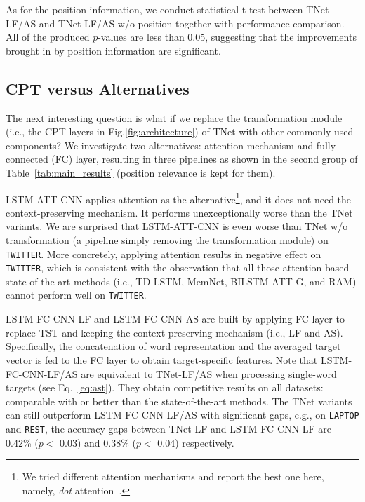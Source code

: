 \documentclass[11pt,a4paper]{article}
\begin{document}
As for the position information, we conduct statistical t-test between TNet-LF/AS and TNet-LF/AS w/o position together with performance comparison. All of the produced $p$-values are less than 0.05, suggesting that the improvements brought in by position information are significant. 






\subsection{CPT versus Alternatives}
The next interesting question is what if we replace the transformation module (i.e., the CPT layers in Fig.\ref{fig:architecture}) of TNet with other commonly-used components? We investigate two alternatives: attention mechanism and fully-connected (FC) layer, resulting in three pipelines as shown in the second group of Table~\ref{tab:main_results} (position relevance is kept for them).

LSTM-ATT-CNN applies attention as the alternative\footnote{We tried different attention mechanisms and report the best one here, namely, \textit{dot} attention~\cite{luong-pham-manning:2015:EMNLP}.}, and it does not need the context-preserving mechanism. It performs unexceptionally worse than the TNet variants. We are surprised that LSTM-ATT-CNN is even worse than TNet w/o transformation (a pipeline simply removing the transformation module) on \texttt{TWITTER}. More concretely, applying attention results in negative effect on \texttt{TWITTER}, which is consistent with the observation that all those attention-based state-of-the-art methods (i.e., TD-LSTM, MemNet, BILSTM-ATT-G, and RAM) cannot perform well on \texttt{TWITTER}. 

LSTM-FC-CNN-LF and LSTM-FC-CNN-AS are built by applying FC layer to replace TST and keeping the context-preserving mechanism (i.e., LF and AS). Specifically, the concatenation of word representation and the averaged target vector is fed to the FC layer to obtain target-specific features. Note that LSTM-FC-CNN-LF/AS are equivalent to TNet-LF/AS when processing single-word targets (see Eq.~\ref{eq:ast}).
They obtain competitive results on all datasets: comparable with or better than the state-of-the-art methods. The TNet variants can still outperform LSTM-FC-CNN-LF/AS with significant gaps, e.g., on \texttt{LAPTOP} and \texttt{REST}, the accuracy gaps between TNet-LF and LSTM-FC-CNN-LF are 0.42\% ($p <$ 0.03) and 0.38\% ($p <$ 0.04) respectively. 
\end{document}

